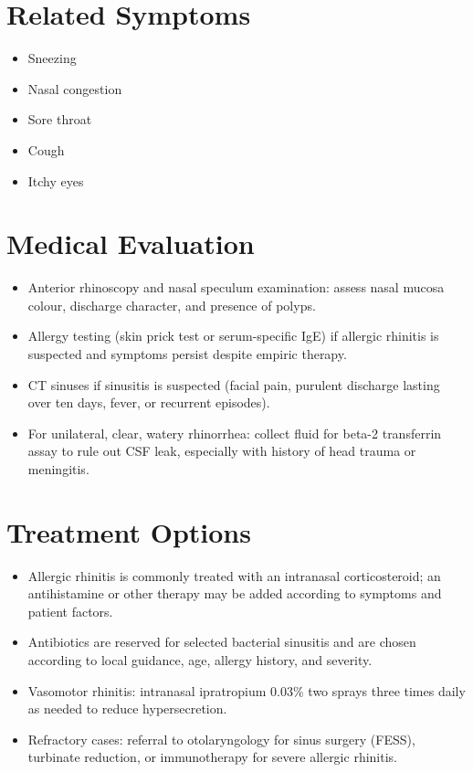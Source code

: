 \section*{Related Symptoms}
\begin{itemize}
  \item Sneezing
  \item Nasal congestion
  \item Sore throat
  \item Cough
  \item Itchy eyes
\end{itemize}

\section*{Medical Evaluation}
\begin{itemize}
  \item Anterior rhinoscopy and nasal speculum examination: assess nasal mucosa colour, discharge character, and presence of polyps.
  \item Allergy testing (skin prick test or serum-specific IgE) if allergic rhinitis is suspected and symptoms persist despite empiric therapy.
  \item CT sinuses if sinusitis is suspected (facial pain, purulent discharge lasting over ten days, fever, or recurrent episodes).
  \item For unilateral, clear, watery rhinorrhea: collect fluid for beta-2 transferrin assay to rule out CSF leak, especially with history of head trauma or meningitis.
\end{itemize}

\section*{Treatment Options}
\begin{itemize}
  \item Allergic rhinitis is commonly treated with an intranasal corticosteroid; an antihistamine or other therapy may be added according to symptoms and patient factors.
  \item Antibiotics are reserved for selected bacterial sinusitis and are chosen according to local guidance, age, allergy history, and severity.
  \item Vasomotor rhinitis: intranasal ipratropium 0.03\% two sprays three times daily as needed to reduce hypersecretion.
  \item Refractory cases: referral to otolaryngology for sinus surgery (FESS), turbinate reduction, or immunotherapy for severe allergic rhinitis.
\end{itemize}

